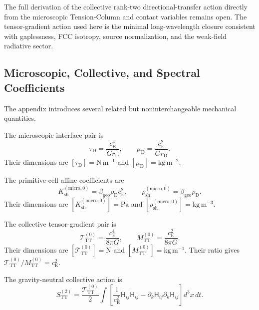 The full derivation of the collective rank-two directional-transfer action directly from the microscopic Tension-Column and contact variables remains open. The tensor-gradient action used here is the minimal long-wavelength closure consistent with gaplessness, FCC isotropy, source normalization, and the weak-field radiative sector.

\subsection{Microscopic, Collective, and Spectral Coefficients}
\label{subsec:n12_coefficient_hierarchy}

The appendix introduces several related but noninterchangeable mechanical quantities.

The microscopic interface pair is
\begin{equation}
    \tau_{\mathrm{D}} = \frac{ c_{\mathrm{E}}^{4} }{ Gr_{\mathrm{D}} }, \qquad \mu_{\mathrm{D}} = \frac{ c_{\mathrm{E}}^{2} }{ Gr_{\mathrm{D}} }.
\end{equation}
Their dimensions are $[\tau_{\mathrm{D}}] = \mathrm{N\,m^{-1}}$ and $[\mu_{\mathrm{D}}] = \mathrm{kg\,m^{-2}}$.

The primitive-cell affine coefficients are
\begin{equation}
    K_{\mathrm{sh}}^{(\mathrm{micro},0)} = \beta_{\mathrm{geo}} \rho_{\mathrm{D}} c_{\mathrm{E}}^{2}, \qquad \rho_{\mathrm{sh}}^{(\mathrm{micro},0)} = \beta_{\mathrm{geo}} \rho_{\mathrm{D}}.
\end{equation}
Their dimensions are $[K_{\mathrm{sh}}^{(\mathrm{micro},0)}] = \mathrm{Pa}$ and $[\rho_{\mathrm{sh}}^{(\mathrm{micro},0)}] = \mathrm{kg\,m^{-3}}$.

The collective tensor-gradient pair is
\begin{equation}
    \mathcal{T}_{\mathrm{TT}}^{(0)} = \frac{ c_{\mathrm{E}}^{4} }{ 8\pi G }, \qquad M_{\mathrm{TT}}^{(0)} = \frac{ c_{\mathrm{E}}^{2} }{ 8\pi G }.
    \label{eq:n12_collective_coefficients}
\end{equation}
Their dimensions are $[\mathcal{T}_{\mathrm{TT}}^{(0)}] = \mathrm{N}$ and $[M_{\mathrm{TT}}^{(0)}] = \mathrm{kg\,m^{-1}}$. Their ratio gives $\mathcal{T}_{\mathrm{TT}}^{(0)} / M_{\mathrm{TT}}^{(0)} = c_{\mathrm{E}}^{2}$.

The gravity-neutral collective action is
\begin{equation}
    S_{\mathrm{TT}}^{(2)} = \frac{ \mathcal{T}_{\mathrm{TT}}^{(0)} }{2} \int \left[ \frac{1}{ c_{\mathrm{E}}^{2} } \dot{\mathsf{H}}_{ij} \dot{\mathsf{H}}_{ij} - \partial_{k}\mathsf{H}_{ij} \partial_{k}\mathsf{H}_{ij} \right] d^{3}x\,dt.
    \label{eq:n12_collective_action}
\end{equation}

